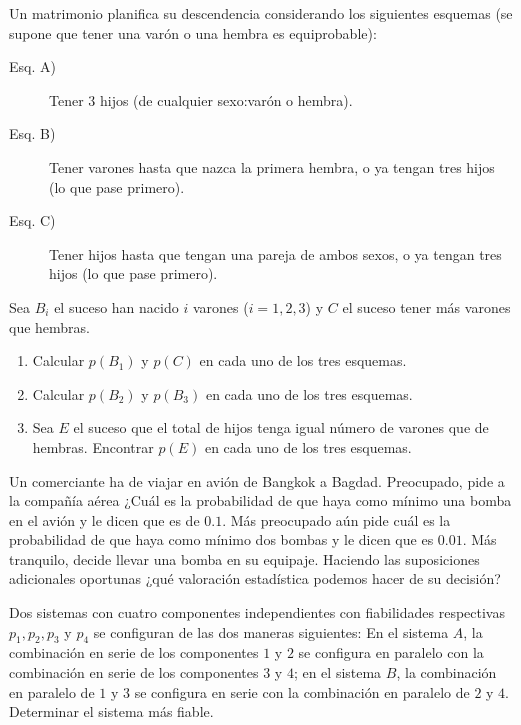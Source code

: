 \documentclass[12pt]{article}
\begin{document}


\probl  Un matrimonio planifica  su descendencia  considerando los
siguientes esquemas (se supone que tener una varón o una hembra es
equiprobable):
\begin{description}
\item[Esq. A)] Tener $3$ hijos (de cualquier sexo:varón o hembra).
\item[Esq. B)] Tener varones hasta que nazca la primera hembra, o ya tengan tres
hijos (lo que pase primero).
\item[Esq. C)] Tener hijos hasta que tengan una pareja de ambos sexos,
 o ya tengan tres hijos (lo que pase primero).
\end{description}
Sea $B_i$ el suceso  han nacido $i$ varones ($i=1, 2, 3$) y $C$ el suceso tener más varones
que hembras.
\begin{enumerate}[1)]
\item Calcular $p(B_1)$ y $p(C)$ en cada uno de  los tres esquemas.
\item Calcular $p(B_2)$ y $p(B_3)$ en cada uno de los tres esquemas.
\item Sea $E$ el suceso que el total de hijos  tenga igual número de
varones que de hembras. Encontrar $p(E)$ en cada uno de los tres
esquemas.

\end{enumerate}

\probl  Un comerciante ha de viajar en avión de Bangkok a Bagdad. Preocupado, pide a la
compañía aérea ¿Cuál es la probabilidad de que haya como mínimo una bomba en el avión y le
dicen que es de $0.1$. Más preocupado aún pide cuál es la probabilidad de que haya como
mínimo dos bombas y le dicen que es $0.01$. Más tranquilo, decide llevar una bomba en su
equipaje. Haciendo las suposiciones adicionales oportunas ¿qué  valoración estadística
podemos hacer de su decisión? 

\probl  Dos sistemas con cuatro componentes independientes con
fiabilidades respectivas $p_1, p_2, p_3$ y $p_4$ se configuran de
las dos maneras siguientes: En el sistema $A$, la combinación en
serie de los componentes $1$  y $2$ se configura en paralelo con la
combinación en serie de los componentes $3$ y $4$; en el sistema
$B$, la combinación en paralelo de $1$ y $3$ se configura en serie
con la combinación en paralelo de $2$ y $4$. Determinar el sistema
más fiable. 
\end{document}
